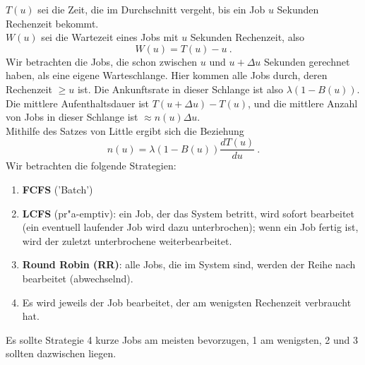 $T(u)$ sei die Zeit, die im Durchschnitt vergeht, bis ein Job $u$ Sekunden Rechenzeit bekommt. \\
$W(u)$ sei die Wartezeit eines Jobs mit $u$ Sekunden Rechenzeit, also
\[W(u) = T(u) - u ~. \]
Wir betrachten die Jobs, die schon zwischen $u$ und $u+\Delta u$ Sekunden gerechnet haben, als eine eigene Warteschlange. Hier kommen alle Jobs durch, deren
Rechenzeit $\geq u$ ist. Die Ankunftsrate in dieser Schlange ist also $\lambda(1-B(u))$.\\
Die mittlere Aufenthaltsdauer ist $T(u+\Delta u) - T(u)$, und die mittlere Anzahl von Jobs in dieser Schlange ist $\approx n(u)\Delta u$. \\
Mithilfe des Satzes von Little ergibt sich die Beziehung
\[n(u)=\lambda (1-B(u))\frac{dT(u)}{du} ~.  \]
Wir betrachten die folgende Strategien:
\begin{enumerate}
\item {\bf FCFS} ('Batch')
\item {\bf LCFS} (pr"a-emptiv): ein Job, der das System betritt, wird sofort bearbeitet (ein eventuell laufender Job wird dazu unterbrochen); wenn ein Job fertig
ist, wird der zuletzt unterbrochene weiterbearbeitet.
\item {\bf {}Round Robin (RR)}: alle Jobs, die im System sind, werden der Reihe nach bearbeitet (abwechselnd).
\item Es wird jeweils der Job bearbeitet, der am wenigsten Rechenzeit verbraucht hat.
\end{enumerate}
Es sollte Strategie 4 kurze Jobs am meisten bevorzugen, 1 am wenigsten, 2 und 3 sollten dazwischen liegen.

